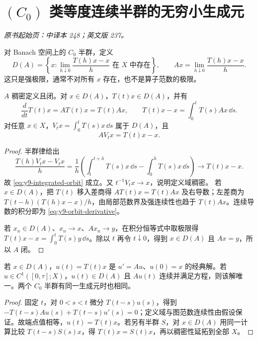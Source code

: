 \section{\texorpdfstring{$(C_0)$}{(C0)} 类等度连续半群的无穷小生成元}\label{sec:yosida-09-03}
\noindent\textit{原书起始页：中译本 248；英文版 237。}

\begin{definition}[生成元及其定义域]
对 Banach 空间上的 $C_0$ 半群，定义
\begin{equation}\label{eq:y9-generator}
 D(A)=\left\{x:\lim_{h\downarrow0}\frac{T(h)x-x}{h}\text{ 在 }X\text{ 中存在}\right\},
 \qquad Ax=\lim_{h\downarrow0}\frac{T(h)x-x}{h}.
\end{equation}
这只是强极限，通常不对所有 $x$ 存在，也不是算子范数的极限。
\end{definition}

\begin{theorem}\label{thm:y9-generator-properties}
$A$ 稠密定义且闭。对 $x\in D(A)$，$T(t)x\in D(A)$，并有
\begin{equation}\label{eq:y9-orbit-derivative}
 \frac{d}{dt}T(t)x=AT(t)x=T(t)Ax,\qquad
 T(t)x-x=\int_0^tT(s)Ax\,\dd s.
\end{equation}
对任意 $x\in X$，$V_tx=\int_0^tT(s)x\,\dd s$ 属于 $D(A)$，且
\begin{equation}\label{eq:y9-integrated-orbit}
 AV_tx=T(t)x-x.
\end{equation}
\end{theorem}
\begin{proof}
半群律给出
\[
 \frac{T(h)V_tx-V_tx}{h}
 =\frac1h\left(\int_t^{t+h}T(s)x\,\dd s-\int_0^hT(s)x\,\dd s\right)
 \longrightarrow T(t)x-x.
\]
故 \eqref{eq:y9-integrated-orbit} 成立。又 $t^{-1}V_tx\to x$，说明定义域稠密。
若 $x\in D(A)$，把 $T(t)$ 移入差商得 $AT(t)x=T(t)Ax$ 及右导数；左差商为
$T(t-h)(T(h)x-x)/h$，由局部范数界及强连续性也趋于 $T(t)Ax$。连续导数的积分即为 \eqref{eq:y9-orbit-derivative}。

若 $x_n\in D(A)$、$x_n\to x$、$Ax_n\to y$，在积分恒等式中取极限得
$T(t)x-x=\int_0^tT(s)y\,\dd s$。除以 $t$ 再令 $t\downarrow0$，得到 $x\in D(A)$ 且 $Ax=y$，所以 $A$ 闭。
\end{proof}

\begin{proposition}[经典解与唯一性]\label{prop:y9-classical-solution}
若 $x\in D(A)$，$u(t)=T(t)x$ 是 $u'=Au$、$u(0)=x$ 的经典解。若 $u\in C^1([0,\tau];X)$，$u(t)\in D(A)$ 且 $Au(t)$ 连续并满足方程，则该解唯一。两个 $C_0$ 半群有同一生成元时也相同。
\end{proposition}
\begin{proof}
固定 $t$，对 $0<s<t$ 微分 $T(t-s)u(s)$，得到
$-T(t-s)Au(s)+T(t-s)u'(s)=0$；定义域与图范数连续性由假设保证。故端点值相等，$u(t)=T(t)x$。若另有半群 $S$，对 $x\in D(A)$ 用同一计算比较 $T(t-s)S(s)x$，得 $T(t)x=S(t)x$，再以稠密性延拓到全部 $X$。
\end{proof}


